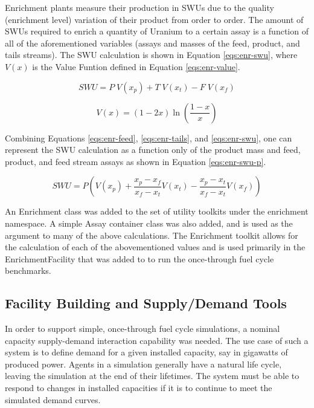 Enrichment plants measure their production in SWUs due to the quality
(enrichment level) variation of their product from order to order. The amount of
SWUs required to enrich a quantity of Uranium to a certain assay is a
function of all of the aforementioned variables (assays and masses of the
feed, product, and tails streams). The SWU calculation is shown in Equation
\ref{eqs:enr-swu}, where $V(x)$ is the Value Funtion defined in Equation
\ref{eqs:enr-value}.

\begin{equation}\label{eqs:enr-swu}
  SWU = P \; V(x_{p}) + T \; V(x_{t}) - F \; V(x_{f})
\end{equation}

\begin{equation}\label{eqs:enr-value}
  V(x) = (1 - 2x) \ln \left( \frac{1-x}{x} \right)
\end{equation}

Combining Equations \ref{eqs:enr-feed}, \ref{eqs:enr-tails}, and
\ref{eqs:enr-swu}, one can represent the SWU calculation as a function only of
the product mass and feed, product, and feed stream assays as shown in
Equation \ref{eqs:enr-swu-p}.

\begin{equation}\label{eqs:enr-swu-p}
  SWU = P \left( V(x_{p}) + \frac{x_{p} - x_{f}}{x_{f} - x_{t}} V(x_{t}) 
        - \frac{x_{p} - x_{t}}{x_{f} - x_{t}} V(x_{f}) \right)
\end{equation}

An Enrichment class was added to the \Cyclus set of utility toolkits under the
enrichment namespace. A simple Assay container class was also added, and is used
as the argument to many of the above calculations. The Enrichment toolkit allows
for the calculation of each of the abovementioned values and is used primarily
in the EnrichmentFacility that was added to \Cycamore to run the once-through
fuel cycle benchmarks.

\subsection{Facility Building and Supply/Demand Tools}

In order to support simple, once-through fuel cycle simulations, a nominal
capacity supply-demand interaction capability was needed. The use case of such a
system is to define demand for a given installed capacity, say in gigawatts of
produced power. Agents in a \Cyclus simulation generally have a natural
life cycle, leaving the simulation at the end of their lifetimes. The system must
be able to respond to changes in installed capacities if it is to continue to
meet the simulated demand curves.

